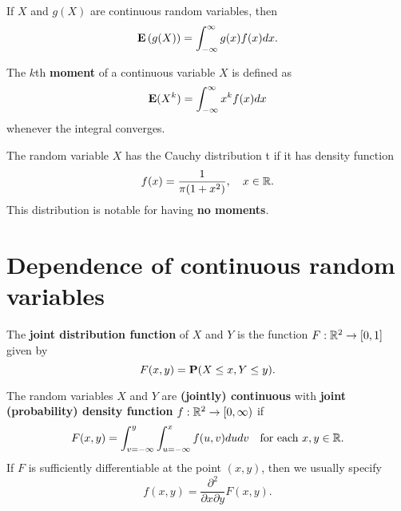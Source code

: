 \begin{theorem}
If $X$ and $g(X)$ are continuous random variables, then \begin{equation*}
    \mathbf{E}\left( g(X) \right) = \int_{-\infty}^\infty g(x)f(x) dx.
\end{equation*}
\end{theorem}

\begin{definition}
The $k$th \textbf{moment} of a continuous variable $X$ is defined as
\begin{equation*}
    \mathbf{E}(X^k) = \int_{-\infty}^\infty x^k f(x) dx
\end{equation*}
whenever the integral converges.
\end{definition}

\begin{example} The random variable $X$ has the Cauchy distribution t if it has density 
function 
\begin{equation*}
    f(x) = \frac{1}{\pi (1+x^2)}, \quad x \in \mathbb{R}.
\end{equation*}
This distribution is notable for having \textbf{no moments}.
\end{example}

\section{Dependence of continuous random variables}
\begin{definition}
The \textbf{joint distribution function} of $X$ and $Y$ is the function $F: \mathbb{R}^2 \to [0, 1]$ given by 
\begin{equation*}
    F(x,y) = \mathbf{P}(X\leq x, Y \leq y).
\end{equation*}
\end{definition}

\begin{definition}
The random variables $X$ and $Y$ are \textbf{(jointly) continuous} with \textbf{joint (probability) density function} $f : \mathbb{R}^2 \to [0, \infty)$ if
\begin{equation*}
    F(x, y)=\int_{v=-\infty}^{y} \int_{u=-\infty}^{x} f(u, v) d u d v \quad \text{for each } x, y\in\mathbb{R}. 
\end{equation*}
If $F$ is sufficiently differentiable at the point $(x , y)$, then we usually specify 
\begin{equation*}
    f(x, y)=\frac{\partial^{2}}{\partial x \partial y} F(x, y).
\end{equation*}
\end{definition}

